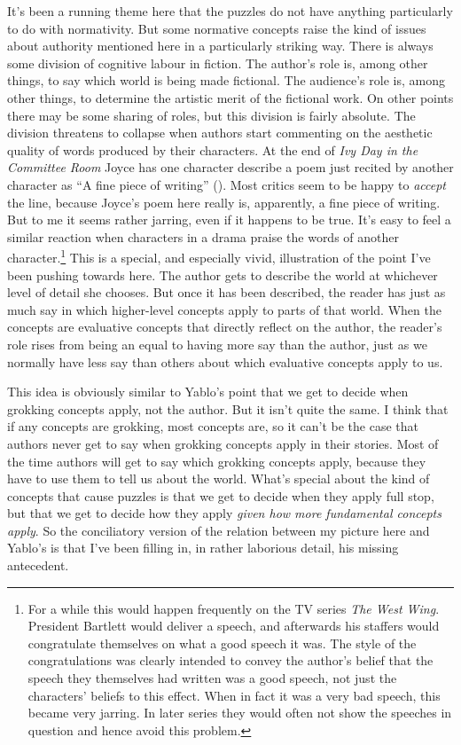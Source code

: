 \documentclass[
  11pt,
  letterpaper,
  DIV=11,
  numbers=noendperiod,
  twoside]{scrartcl}
\begin{document}
It's been a running theme here that the puzzles do not have anything
particularly to do with normativity. But some normative concepts raise
the kind of issues about authority mentioned here in a particularly
striking way. There is always some division of cognitive labour in
fiction. The author's role is, among other things, to say which world is
being made fictional. The audience's role is, among other things, to
determine the artistic merit of the fictional work. On other points
there may be some sharing of roles, but this division is fairly
absolute. The division threatens to collapse when authors start
commenting on the aesthetic quality of words produced by their
characters. At the end of \emph{Ivy Day in the Committee Room} Joyce has
one character describe a poem just recited by another character as ``A
fine piece of writing'' (). Most critics seem to be happy to \emph{accept} the line, because
Joyce's poem here really is, apparently, a fine piece of writing. But to
me it seems rather jarring, even if it happens to be true. It's easy to
feel a similar reaction when characters in a drama praise the words of
another character.\footnote{For a while this would happen frequently on
  the TV series \emph{The West Wing}. President Bartlett would deliver a
  speech, and afterwards his staffers would congratulate themselves on
  what a good speech it was. The style of the congratulations was
  clearly intended to convey the author's belief that the speech they
  themselves had written was a good speech, not just the characters'
  beliefs to this effect. When in fact it was a very bad speech, this
  became very jarring. In later series they would often not show the
  speeches in question and hence avoid this problem.} This is a special,
and especially vivid, illustration of the point I've been pushing
towards here. The author gets to describe the world at whichever level
of detail she chooses. But once it has been described, the reader has
just as much say in which higher-level concepts apply to parts of that
world. When the concepts are evaluative concepts that directly reflect
on the author, the reader's role rises from being an equal to having
more say than the author, just as we normally have less say than others
about which evaluative concepts apply to us.

This idea is obviously similar to Yablo's point that we get to decide
when grokking concepts apply, not the author. But it isn't quite the
same. I think that if any concepts are grokking, most concepts are, so
it can't be the case that authors never get to say when grokking
concepts apply in their stories. Most of the time authors will get to
say which grokking concepts apply, because they have to use them to tell
us about the world. What's special about the kind of concepts that cause
puzzles is that we get to decide when they apply full stop, but that we
get to decide how they apply \emph{given how more fundamental concepts
apply}. So the conciliatory version of the relation between my picture
here and Yablo's is that I've been filling in, in rather laborious
detail, his missing antecedent.
\end{document}
